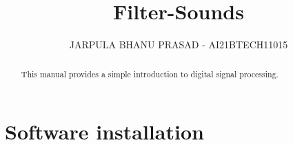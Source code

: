 \documentclass[journal,12pt,twocolumn]{IEEEtran}
\renewcommand\thesection{\arabic{section}}
\begin{document}
\let\StandardTheFigure\thefigure
\renewcommand{\thefigure}{\thesection}



\makeatletter
{}
\makeatother

\let\StandardTheFigure\thefigure
\let\StandardTheTable\thetable
\let\vec\mathbf
{}

\vspace{3cm}


\title{%
	Filter-Sounds
}

%
%
%

\author{JARPULA BHANU PRASAD - AI21BTECH11015}
\maketitle

\tableofcontents

\bigskip

\renewcommand{\thefigure}{\theenumi}
\renewcommand{\thetable}{\theenumi}

\begin{abstract}
This manual provides a simple introduction to digital signal processing.
\end{abstract}
\section{Software installation}
\end{document}
